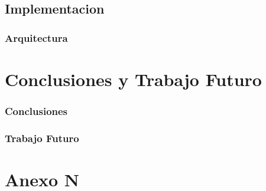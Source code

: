 \documentclass[letterpaper,12pt,openany,oneside]{book}
\begin{document}
\section{Implementacion}
\subsection{Arquitectura}








\chapter{Conclusiones y Trabajo Futuro}
\subsection{Conclusiones}
\subsection{Trabajo Futuro}


%

\appendix
\renewcommand{\appendixname}{Anexo N}

\chapter{Anexo N}
\end{document}
